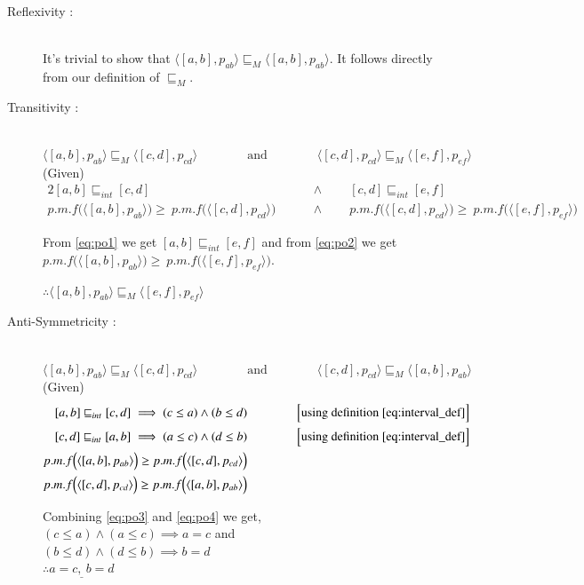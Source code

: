\documentclass[final,3p, review, times]{Elsevier/elsarticle}
\begin{document}
\begin{description}
\item[Reflexivity :] \hfill \\
	It's trivial to show that $\langle[a,b],p_{ab}\rangle\sqsubseteq_M\langle[a,b],p_{ab}\rangle$. It follows directly from our definition of $\sqsubseteq_M$.
\item[Transitivity :] \hfill \\
	$\langle[a,b],p_{ab}\rangle\sqsubseteq_M\langle[c,d],p_{cd}\rangle\qquad\qquad\mathrm{and}\qquad\qquad\langle[c,d],p_{cd}\rangle\sqsubseteq_M\langle[e,f],p_{ef}\rangle\qquad\qquad$ (Given)	
\begin{alignat}{2}
    [a,b]\sqsubseteq_{int}[c,d] &\qquad\land\qquad[c,d]\sqsubseteq_{int}[e,f]\label{eq:po1}\\
	p.m.f\Big(\langle[a,b],p_{ab}\rangle\Big)\geq\ p.m.f\Big(\langle[c,d],p_{cd}\rangle\Big) &\qquad\land\qquad p.m.f\Big(\langle[c,d],p_{cd}\rangle\Big)\geq\ p.m.f\Big(\langle[e,f],p_{ef}\rangle\Big)\label{eq:po2}
\end{alignat}
	
	From \ref{eq:po1} we get $[a,b]\sqsubseteq_{int}[e,f]$ and from \ref{eq:po2} we get $p.m.f\Big(\langle[a,b],p_{ab}\rangle\Big)\geq\ p.m.f\Big(\langle[e,f],p_{ef}\rangle\Big)$.
	
	$\therefore\langle[a,b],p_{ab}\rangle\sqsubseteq_M\langle[e,f],p_{ef}\rangle$
\item[Anti-Symmetricity :] \hfill \\
	$\langle[a,b],p_{ab}\rangle\sqsubseteq_M\langle[c,d],p_{cd}\rangle\qquad\qquad\mathrm{and}\qquad\qquad\langle[c,d],p_{cd}\rangle\sqsubseteq_M\langle[a,b],p_{ab}\rangle\qquad\qquad$ (Given)
\begin{alignat}{2}
    [a,b]\sqsubseteq_{int}[c,d]\implies (c\leq a)\land (b\leq d)&\qquad\qquad\Big[\mathrm{using\ definition}\ \ref{eq:interval_def}\Big]\label{eq:po3}\\
	[c,d]\sqsubseteq_{int}[a,b]\implies (a\leq c)\land (d\leq b)&\qquad\qquad\Big[\mathrm{using\ definition}\ \ref{eq:interval_def}\Big]\label{eq:po4}\\
	p.m.f\Big(\langle[a,b],p_{ab}\rangle\Big)\geq p.m.f\Big(\langle[c,d],p_{cd}\rangle\Big)&\label{eq:po5}\\
	p.m.f\Big(\langle[c,d],p_{cd}\rangle\Big)\geq p.m.f\Big(\langle[a,b],p_{ab}\rangle\Big)&\label{eq:po6}
\end{alignat}

Combining \ref{eq:po3} and \ref{eq:po4} we get,\\
	$(c\leq a)\land (a\leq c)\implies a=c$ and\\
	$(b\leq d)\land (d\leq b)\implies b=d$\\
	$\therefore \underline{a=c,\ b=d}$
	

\end{description}
\end{document}

